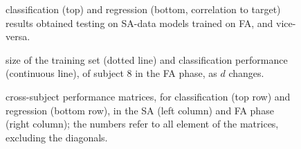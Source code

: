 \documentclass[10pt]{bmc_article}
\def\texttt{[image: ]}
\newenvironment{bmcformat}{\begin{raggedright}\baselineskip20pt\sloppy\setboolean{publ}{false}}{\end{raggedright}\baselineskip20pt\sloppy}
\begin{document}
\begin{bmcformat}
\begin{figure}[!ht] \centering
   \caption{classification (top) and regression (bottom, correlation to target)
      results obtained testing on SA-data models trained on FA, and vice-versa.}
  \label{fig:2on1}
\end{figure}

\begin{figure}[!ht] \centering
  \caption{size of the training set (dotted line) and classification
    performance (continuous line), of subject $8$ in the FA phase, as
    $d$ changes.}
  \label{fig:subj8}
\end{figure}

\begin{figure}[!ht] \centering
  \caption{cross-subject performance matrices, for classification (top
    row) and regression (bottom row), in the SA (left column)
    and FA phase (right column); the numbers refer to all element of
    the matrices, excluding the diagonals.}
  \label{fig:cross}
\end{figure}

\end{bmcformat}
\end{document}
